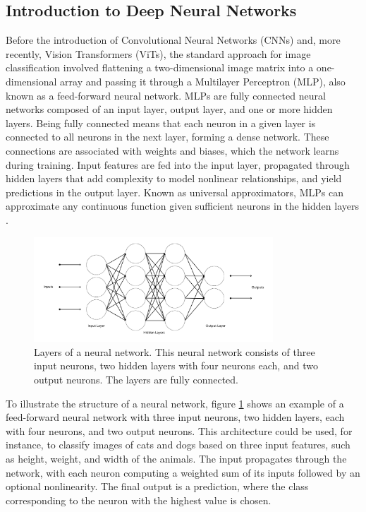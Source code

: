 
\subsection{Introduction to Deep Neural Networks}
\label{sec:intro_DNN}
Before the introduction of Convolutional Neural Networks (CNNs) and, more recently, Vision Transformers (ViTs), the standard approach for image classification involved flattening a two-dimensional image matrix into a one-dimensional array and passing it through a Multilayer Perceptron (MLP), also known as a feed-forward neural network. MLPs are fully connected neural networks composed of an input layer, output layer, and one or more hidden layers. Being fully connected means that each neuron in a given layer is connected to all neurons in the next layer, forming a dense network. These connections are associated with weights and biases, which the network learns during training. Input features are fed into the input layer, propagated through hidden layers that add complexity to model nonlinear relationships, and yield predictions in the output layer. Known as universal approximators, MLPs can approximate any continuous function given sufficient neurons in the hidden layers \cite{zhang2023dive,HORNIK1989359}.

\begin{figure}[ht]
    \centering
    \includegraphics[width=0.8\textwidth]{Images/cnn_layers.png} 
    \caption{Layers of a neural network. This neural network consists of three input neurons, two hidden layers with four neurons each, and two output neurons. The layers are fully connected.}
    \label{fig:dnn_layers}
\end{figure}

To illustrate the structure of a neural network, figure \ref{fig:dnn_layers} shows an example of a feed-forward neural network with three input neurons, two hidden layers, each with four neurons, and two output neurons. This architecture could be used, for instance, to classify images of cats and dogs based on three input features, such as height, weight, and width of the animals. The input propagates through the network, with each neuron computing a weighted sum of its inputs followed by an optional nonlinearity. The final output is a prediction, where the class corresponding to the neuron with the highest value is chosen.


